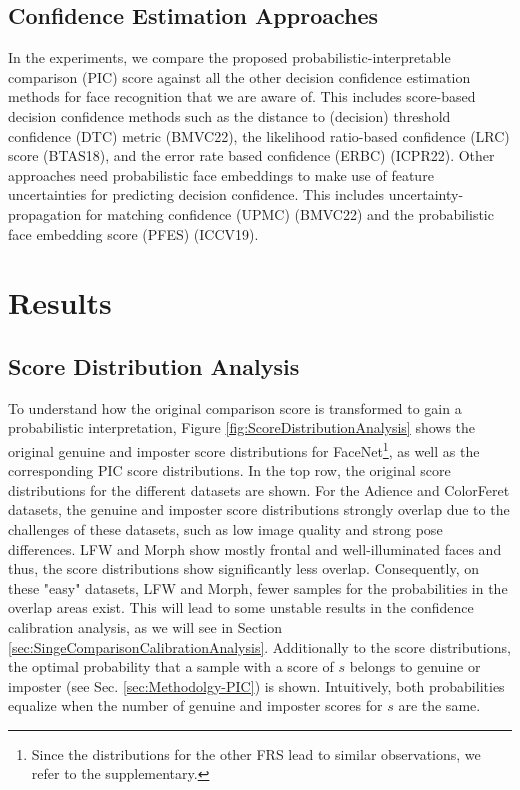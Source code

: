 \documentclass[10pt,twocolumn,letterpaper]{article}
\begin{document}
\subsection{Confidence Estimation Approaches}
In the experiments, we compare the proposed probabilistic-interpretable comparison (PIC) score against all the other decision confidence estimation methods for face recognition that we are aware of.
This includes score-based decision confidence methods such as the distance to (decision) threshold confidence (DTC) metric \cite{DBLP:journals/corr/abs-2210-10354} (BMVC22), the likelihood ratio-based confidence (LRC) score \cite{DBLP:conf/btas/ZeinstraMVS18} (BTAS18), and the error rate based confidence (ERBC) \cite{huberICPR22} (ICPR22).
Other approaches need probabilistic face embeddings to make use of feature uncertainties for predicting decision confidence.
This includes uncertainty-propagation for matching confidence (UPMC) \cite{DBLP:journals/corr/abs-2210-10354} (BMVC22) and the probabilistic face embedding score (PFES) \cite{DBLP:conf/iccv/ShiJ19} (ICCV19).

\section{Results}
\label{sec:Results}

\subsection{Score Distribution Analysis}
\label{sec:ScoreDistributionAnalysis}

To understand how the original comparison score is transformed to gain a probabilistic interpretation, Figure \ref{fig:ScoreDistributionAnalysis} shows the original genuine and imposter score distributions for FaceNet\footnote{Since the distributions for the other FRS lead to similar observations, we refer to the supplementary.}, as well as the corresponding PIC score distributions.
In the top row, the original score distributions for the different datasets are shown.
For the Adience and ColorFeret datasets, the genuine and imposter score distributions strongly overlap due to the challenges of these datasets, such as low image quality and strong pose differences.
LFW and Morph show mostly frontal and well-illuminated faces and thus, the score distributions show significantly less overlap. 
Consequently, on these "easy" datasets, LFW and Morph, fewer samples for the probabilities in the overlap areas exist.
This will lead to some unstable results in the confidence calibration analysis, as we will see in Section \ref{sec:SingeComparisonCalibrationAnalysis}.
Additionally to the score distributions, the optimal probability that a sample with a score of $s$ belongs to genuine or imposter (see Sec. \ref{sec:Methodolgy-PIC}) is shown. 
Intuitively, both probabilities equalize when the number of genuine and imposter scores for $s$ are the same.
\end{document}
